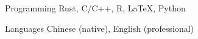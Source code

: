 

\begin{cvskills}

  \cvskill
  {Programming}
  {Rust, C/C++, R, \LaTeX, Python}

  \cvskill
  {Languages}
  {Chinese (native), English (professional)}

\end{cvskills}
